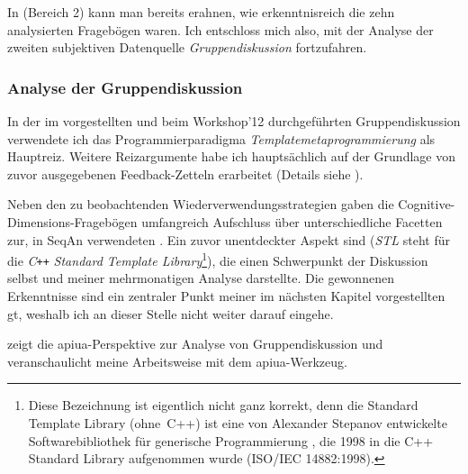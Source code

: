 In  (Bereich 2) kann man bereits erahnen, wie erkenntnisreich die zehn analysierten Fragebögen waren. Ich entschloss mich also, mit der Analyse der zweiten subjektiven Datenquelle \textit{Gruppendiskussion} fortzufahren.



\subsubsection{Analyse der Gruppendiskussion}

In der im  vorgestellten und beim Workshop'12 durchgeführten Gruppendiskussion verwendete ich das Programmierparadigma \textit{Templatemetaprogrammierung} als Hauptreiz. Weitere Reizargumente habe ich hauptsächlich auf der Grundlage von zuvor ausgegebenen Feedback-Zetteln erarbeitet (Details siehe ).

Neben den zu beobachtenden Wiederverwendungsstrategien gaben die Cognitive-Dimensions-Fragebögen umfangreich Aufschluss über unterschiedliche Facetten zur, in SeqAn verwendeten . Ein zuvor unentdeckter Aspekt sind  (\textit{STL} steht für die \textit{C}\verb$++$ \textit{Standard Template Library}\footnote{Diese Bezeichnung ist eigentlich nicht ganz korrekt, denn die Standard Template Library (ohne~C++) ist eine von Alexander Stepanov entwickelte Softwarebibliothek für generische Programmierung \citep{TheStandardTemplat:1994vd}, die 1998 in die C++ Standard Library aufgenommen wurde (ISO/IEC 14882:1998).}), die einen Schwerpunkt der Diskussion selbst und meiner mehrmonatigen Analyse darstellte. Die gewonnenen Erkenntnisse sind ein zentraler Punkt meiner im nächsten Kapitel vorgestellten \gls{gt}, weshalb ich an dieser Stelle nicht weiter darauf eingehe.

 zeigt die \gls{apiua}-Perspektive zur Analyse von Gruppendiskussion und veranschaulicht meine Arbeitsweise mit dem \gls{apiua}-Werkzeug.

